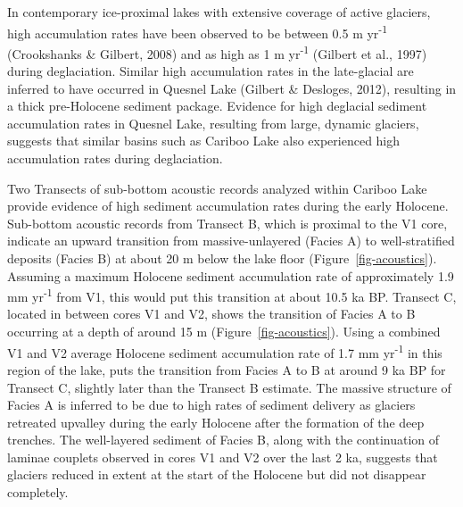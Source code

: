 \documentclass[
  letterpaper,
  DIV=11,
  numbers=noendperiod]{scrartcl}
\begin{document}
In contemporary ice-proximal lakes with extensive coverage of active
glaciers, high accumulation rates have been observed to be between 0.5 m
yr\textsuperscript{-1} (Crookshanks \& Gilbert, 2008) and as high as 1 m
yr\textsuperscript{-1} (Gilbert et al., 1997) during deglaciation.
Similar high accumulation rates in the late-glacial are inferred to have
occurred in Quesnel Lake (Gilbert \& Desloges, 2012), resulting in a
thick pre-Holocene sediment package. Evidence for high deglacial
sediment accumulation rates in Quesnel Lake, resulting from large,
dynamic glaciers, suggests that similar basins such as Cariboo Lake also
experienced high accumulation rates during deglaciation.

Two Transects of sub-bottom acoustic records analyzed within Cariboo
Lake provide evidence of high sediment accumulation rates during the
early Holocene. Sub-bottom acoustic records from Transect B, which is
proximal to the V1 core, indicate an upward transition from
massive-unlayered (Facies A) to well-stratified deposits (Facies B) at
about 20 m below the lake floor (Figure~\ref{fig-acoustics}). Assuming a
maximum Holocene sediment accumulation rate of approximately 1.9 mm
yr\textsuperscript{-1} from V1, this would put this transition at about
10.5 ka BP. Transect C, located in between cores V1 and V2, shows the
transition of Facies A to B occurring at a depth of around 15 m
(Figure~\ref{fig-acoustics}). Using a combined V1 and V2 average
Holocene sediment accumulation rate of 1.7 mm yr\textsuperscript{-1} in
this region of the lake, puts the transition from Facies A to B at
around 9 ka BP for Transect C, slightly later than the Transect B
estimate. The massive structure of Facies A is inferred to be due to
high rates of sediment delivery as glaciers retreated upvalley during
the early Holocene after the formation of the deep trenches. The
well-layered sediment of Facies B, along with the continuation of
laminae couplets observed in cores V1 and V2 over the last 2 ka,
suggests that glaciers reduced in extent at the start of the Holocene
but did not disappear completely.
\end{document}
